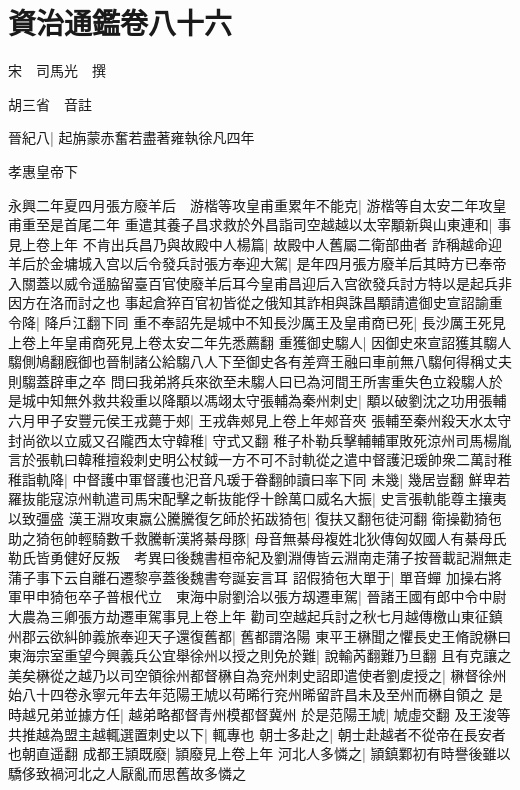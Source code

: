 \chapter{資治通鑑卷八十六}
宋　司馬光　撰

胡三省　音註

晉紀八|{
	起旃蒙赤奮若盡著雍執徐凡四年}


孝惠皇帝下

永興二年夏四月張方廢羊后　游楷等攻皇甫重累年不能克|{
	游楷等自太安二年攻皇甫重至是首尾二年}
重遣其養子昌求救於外昌詣司空越越以太宰顒新與山東連和|{
	事見上卷上年}
不肯出兵昌乃與故殿中人楊篇|{
	故殿中人舊屬二衛部曲者}
詐稱越命迎羊后於金墉城入宫以后令發兵討張方奉迎大駕|{
	是年四月張方廢羊后其時方已奉帝入關蓋以威令遥脇留臺百官使廢羊后耳今皇甫昌迎后入宫欲發兵討方特以是起兵非因方在洛而討之也}
事起倉猝百官初皆從之俄知其詐相與誅昌顒請遣御史宣詔諭重令降|{
	降戶江翻下同}
重不奉詔先是城中不知長沙厲王及皇甫商已死|{
	長沙厲王死見上卷上年皇甫商死見上卷太安二年先悉薦翻}
重獲御史騶人|{
	因御史來宣詔獲其騶人騶側鳩翻廐御也晉制諸公給騶八人下至御史各有差齊王融曰車前無八騶何得稱丈夫則騶蓋辟車之卒}
問曰我弟將兵來欲至未騶人曰已為河間王所害重失色立殺騶人於是城中知無外救共殺重以降顒以馮翊太守張輔為秦州刺史|{
	顒以破劉沈之功用張輔}
六月甲子安豐元侯王戎薨于郟|{
	王戎犇郟見上卷上年郟音夾}
張輔至秦州殺天水太守封尚欲以立威又召隴西太守韓稚|{
	守式又翻}
稚子朴勒兵擊輔輔軍敗死涼州司馬楊胤言於張軌曰韓稚擅殺刺史明公杖鉞一方不可不討軌從之遣中督護汜瑗帥衆二萬討稚稚詣軌降|{
	中督護中軍督護也汜音凡瑗于眷翻帥讀曰率下同}
未幾|{
	幾居豈翻}
鮮卑若羅抜能寇涼州軌遣司馬宋配擊之斬抜能俘十餘萬口威名大振|{
	史言張軌能尊主攘夷以致彊盛}
漢王淵攻東嬴公騰騰復乞師於拓跋猗㐌|{
	復扶又翻㐌徒河翻}
衛操勸猗㐌助之猗㐌帥輕騎數千救騰斬漢將綦母豚|{
	母音無綦母複姓北狄傳匈奴國人有綦母氏勒氏皆勇健好反叛　考異曰後魏書桓帝紀及劉淵傳皆云淵南走蒲子按晉載記淵無走蒲子事下云自離石遷黎亭蓋後魏書夸誕妄言耳}
詔假猗㐌大單于|{
	單音蟬}
加操右將軍甲申猗㐌卒子普根代立　東海中尉劉洽以張方刼遷車駕|{
	晉諸王國有郎中令中尉大農為三卿張方劫遷車駕事見上卷上年}
勸司空越起兵討之秋七月越傳檄山東征鎮州郡云欲糾帥義旅奉迎天子還復舊都|{
	舊都謂洛陽}
東平王楙聞之懼長史王脩說楙曰東海宗室重望今興義兵公宜舉徐州以授之則免於難|{
	說輸芮翻難乃旦翻}
且有克讓之美矣楙從之越乃以司空領徐州都督楙自為兖州刺史詔即遣使者劉䖍授之|{
	楙督徐州始八十四卷永寧元年去年范陽王虓以苟晞行兖州晞留許昌未及至州而楙自領之}
是時越兄弟並據方任|{
	越弟略都督青州模都督冀州}
於是范陽王虓|{
	虓虛交翻}
及王浚等共推越為盟主越輒選置刺史以下|{
	輒專也}
朝士多赴之|{
	朝士赴越者不從帝在長安者也朝直遥翻}
成都王頴既廢|{
	頴廢見上卷上年}
河北人多憐之|{
	頴鎮鄴初有時譽後雖以驕侈致禍河北之人厭亂而思舊故多憐之}

